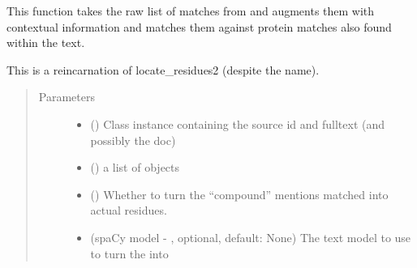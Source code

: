 \documentclass[letterpaper,10pt,english]{sphinxmanual}
\begin{document}

\begin{fulllineitems}
\label{\detokenize{functions:pyresid.locate_residues}}
This function takes the raw list of matches from {\hyperref[\detokenize{functions:pyresid.identify_residues}]{}} and augments them
with contextual information and matches them against protein matches also found within the text.

This is a reincarnation of locate\_residues2 (despite the name).
\begin{quote}\begin{description}
\item[{Parameters}] \leavevmode\begin{itemize}
\item {} 
 ({\hyperref[\detokenize{classes:pyresid.SourceClass}]{}}) \textendash{} Class instance containing the source id and fulltext (and possibly the  doc)

\item {} 
 () \textendash{} a list of {\hyperref[\detokenize{classes:pyresid.MatchClass}]{}} objects

\item {} 
 (\sphinxstyleliteralemphasis{\sphinxupquote{, }}\sphinxstyleliteralemphasis{\sphinxupquote{, }}) \textendash{} Whether to turn the “compound” mentions matched into actual residues.

\item {} 
 (spaCy model - , optional, default: None) \textendash{} The text model to use to turn the  into 


\end{itemize}
\end{description}
\end{quote}
\end{fulllineitems}
\end{document}
